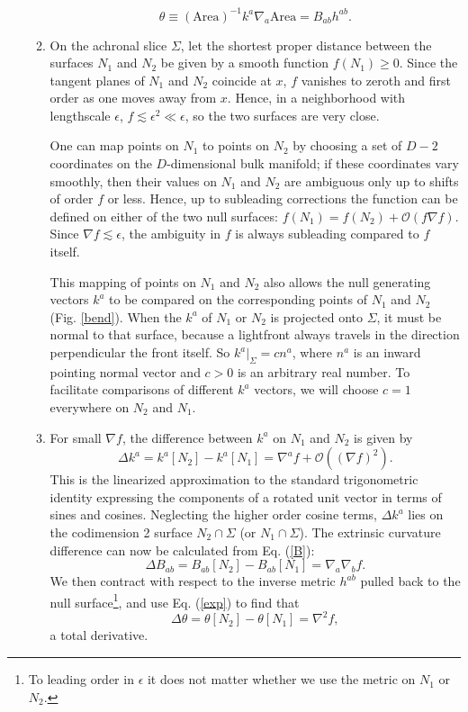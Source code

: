 \documentclass[12pt]{article}
\begin{document}
\begin{enumerate}
\begin{enumerate}
\begin{equation}\label{exp}
\theta \equiv (\mathrm{Area})^{-1} k^a \nabla_a \mathrm{Area} = B_{ab} h^{ab}.
\end{equation}
	\item On the achronal slice $\Sigma$, let the shortest proper distance between the surfaces $N_1$ and $N_2$ be given by a smooth function $f(N_1) \ge 0$.  Since the tangent planes of $N_1$ and $N_2$ coincide at $x$, $f$ vanishes to zeroth and first order as one moves away from $x$.  Hence, in a neighborhood with lengthscale $\epsilon$, $f \lesssim \epsilon^2 \ll \epsilon$, so the two surfaces are very close.

One can map points on $N_1$ to points on $N_2$ by choosing a set of $D-2$ coordinates on the $D$-dimensional bulk manifold; if these coordinates vary smoothly, then their values on $N_1$ and $N_2$ are ambiguous only up to shifts of order $f$ or less.   Hence, up to subleading corrections the function can be defined on either of the two null surfaces: $f(N_1) = f(N_2) + \mathcal{O}(f \nabla f)$.  Since $\nabla f \lesssim \epsilon$, the ambiguity in $f$ is always subleading compared to $f$ itself.

This mapping of points on $N_1$ and $N_2$ also allows the null generating vectors $k^a$ to be compared on the corresponding points of $N_1$ and $N_2$ (Fig. \ref{bend}).  When the $k^a$ of $N_1$ or $N_2$ is projected onto $\Sigma$, it must be normal to that surface, because a lightfront always travels in the direction perpendicular the front itself.  So $k^a|_\Sigma = c n^a$, where $n^a$ is an inward pointing normal vector and $c > 0$ is an arbitrary real number.  To facilitate comparisons of different $k^a$ vectors, we will choose $c = 1$ everywhere on $N_2$ and $N_1$.
	\item For small $\nabla f$, the difference between $k^a$ on $N_1$ and $N_2$ is given by
\begin{equation}
\Delta k^a = k^{a}[N_2] - k^{a}[N_1] = \nabla^a f + \mathcal{O}((\nabla f)^2).
\end{equation}
This is the linearized approximation to the standard trigonometric identity expressing the components of a rotated unit vector in terms of sines and cosines.  Neglecting the higher order cosine terms, $\Delta k^a$ lies on the codimension 2 surface $N_2 \cap \Sigma$ (or $N_1 \cap \Sigma$).  The extrinsic curvature difference can now be calculated from Eq. (\ref{B}):
\begin{equation}
\Delta B_{ab} = B_{ab}[N_2] - B_{ab}[N_1] = \nabla_a \nabla_b f.
\end{equation}
We then contract with respect to the inverse metric $h^{ab}$ pulled back to the null surface\footnote{To leading order in $\epsilon$ it does not matter whether we use the metric on $N_1$ or $N_2$.}, and use Eq. (\ref{exp}) to find that
\begin{equation}
\Delta \theta = \theta[N_2] - \theta[N_1] = \nabla^2 f,
\end{equation}
a total derivative.  


\end{enumerate}
\end{enumerate}
\end{document}
